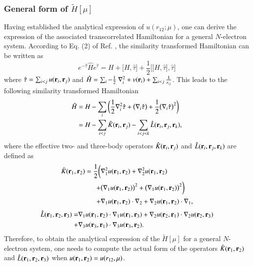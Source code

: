 \documentclass[aip,jcp,reprint,noshowkeys,superscriptaddress]{revtex4-1}
\newcommand{\br}[0]{{\bf {r}}}
\newcommand{\bri}[1]{{\bf r}_{#1}}
\begin{document}
\subsubsection{General form of $\tilde{H}[\mu]$ }
Having established the analytical expression of $u(r_{12};\mu)$, one can derive the expression of the associated transcorrelated Hamiltonian for a general $N$-electron system.  
According to Eq. (2) of Ref. , the similarity transformed Hamiltonian can be written as 
\begin{equation}
 \label{ht_def_g}
 e^{-\hat{\tau}} \hat{H} e^{\hat{\tau}} = H + \big[ H,\hat{\tau} \big] + \frac{1}{2}\bigg[ \big[H,\hat{\tau}\big],\hat{\tau}\bigg]
\end{equation}
where $\hat{\tau} = \sum_{i<j}u(\br{}_i,\br{}_j)$ and $\hat{H} = \sum_i -\frac{1}{2} \nabla^2_i + v(\br{}_i) + \sum_{i<j} \frac{1}{r_{ij}}$. 
This leads to the following similarity transformed Hamiltonian 
\begin{equation}
 \begin{aligned}
 \label{ht_def_gu}
 \tilde{H} & = H - \sum_i \bigg( \frac{1}{2} \nabla_i^2 \hat{\tau} + \big(\nabla_i \hat{\tau} \big) + \frac{1}{2} \big(\nabla_i \hat{\tau} \big)^2  \bigg) \\
           & = H - \sum_{i<j} \hat{K}(\bri{i},\bri{j}) - \sum_{i<j<k} \hat{L}(\bri{i},\bri{j},\bri{k}),
 \end{aligned}
\end{equation}
where the effective two- and three-body operators $\hat{K}(\bri{i},\bri{j})$ and $\hat{L}(\bri{i},\bri{j},\bri{k})$ are defined as
\begin{equation}
 \begin{aligned}
 \label{def_k}
  \hat{K}(\bri{1},\bri{2})  = \frac{1}{2} \bigg( &\nabla_1^2 u(\bri{1},\bri{2}) + \nabla_2^2u(\bri{1},\bri{2}) \\
                                               + &\big(\nabla_1 u(\bri{1},\bri{2}) \big) ^2 + \big(\nabla_1 u(\bri{1},\bri{2}) \big) ^2 \bigg) \\
                                               + &\nabla_1 u(\bri{1},\bri{2}) \cdot \nabla_2 + \nabla_2 u(\bri{1},\bri{2}) \cdot \nabla_1,
 \end{aligned}
\end{equation}
\begin{equation}
 \begin{aligned}
 \label{def_k}
  \hat{L}(\bri{1},\bri{2},\bri{3})  = & \nabla_1 u(\bri{1},\bri{2}) \cdot \nabla_1 u(\bri{1},\bri{3}) + \nabla_2 u(\bri{2},\bri{1}) \cdot \nabla_2 u(\bri{2},\bri{3})  \\
                                     + & \nabla_3 u(\bri{3},\bri{1}) \cdot \nabla_3 u(\bri{3},\bri{2}).
 \end{aligned}
\end{equation}
Therefore, to obtain the analytical expression of the $\tilde{H}[\mu]$ for a general $N$-electron system, 
one needs to compute the actual form of the operators $\hat{K}(\bri{1},\bri{2})$ and $\hat{L}(\bri{1},\bri{2},\bri{3})$ when $u(\bri{1},\bri{2}) = u(r_{12},\mu)$. 
\end{document}
